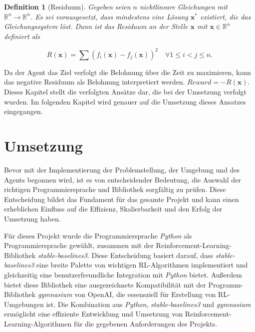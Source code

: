 \documentclass{article}
\theoremstyle{newline}
\newtheorem{definition}{Definition}[section]
\begin{document}
\begin{onehalfspace}
\begin{definition}[Residuum]
	Gegeben seien $n$ nichtlineare Gleichungen mit $\mathbb{R}^n \rightarrow \mathbb{R}^n$. Es sei vorausgesetzt, dass mindestens eine Lösung $\mathbf{x}^{\ast}$ existiert, die das Gleichungssystem löst. Dann ist das Residuum an der Stelle $\mathbf{x}$ mit $\mathbf{x} \in \mathbb{R}^n$ definiert als
	
	\begin{equation}
		R(\mathbf{x}) = \sum\limits (f_i(\mathbf{x}) - f_j(\mathbf{x}))^2 \quad \forall 1 \leq i < j \leq n.
	\end{equation}
\end{definition}

Da der Agent das Ziel verfolgt die Belohnung über die Zeit zu maximieren, kann das negative Residuum als Belohnung interpretiert werden. $Reward = -R(\mathbf{x})$.
\\

Dieses Kapitel stellt die verfolgten Ansätze dar, die bei der Umsetzung verfolgt wurden. Im folgenden Kapitel wird genauer auf die Umsetzung dieses Ansatzes eingegangen.

\section{Umsetzung}

Bevor mit der Implementierung der Problemstellung, der Umgebung und des Agents begonnen wird, ist es von entscheidender Bedeutung, die Auswahl der richtigen Programmiersprache und Bibliothek sorgfältig zu prüfen. Diese Entscheidung bildet das Fundament für das gesamte Projekt und kann einen erheblichen Einfluss auf die Effizienz, Skalierbarkeit und den Erfolg der Umsetzung haben.
\medskip

Für dieses Projekt wurde die Programmiersprache \textit{Python} als Programmiersprache gewählt, zusammen mit der Reinforcement-Learning-Bibliothek \textit{stable-baselines3}. Diese Entscheidung basiert darauf, dass \textit{stable-baselines3} eine breite Palette von wichtigen RL-Algorithmen implementiert und gleichzeitig eine benutzerfreundliche Integration mit \textit{Python} bietet. Außerdem bietet diese Bibliothek eine ausgezeichnete Kompatibilität mit der Programm-Bibliothek \textit{gymnasium} von OpenAI, die essensziell für Erstellung von RL-Umgebungen ist. Die Kombination aus \textit{Python}, \textit{stable-baselines3} und \textit{gymnasium} ermöglicht eine effiziente Entwicklung und Umsetzung von Reinforcement-Learning-Algorithmen für die gegebenen Anforderungen des Projekts.
\\


\end{onehalfspace}
\end{document}
